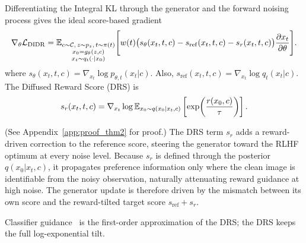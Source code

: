 \begin{theorem}
\label{thm:score_gradient}
Differentiating the Integral KL through the generator and the forward noising process gives the ideal score-based gradient
\begin{equation}
\begin{aligned}
\nabla_\theta\mathcal{L}_{\mathrm{DIDR}}
=
\mathbb{E}_{\substack{c\sim\mathcal{C},\,z\sim p_z,\,t\sim\pi(t)\\
x_0=g_\theta(z,c)\\
x_t\sim q_t(\cdot|x_0)}}
\Bigg[
w(t)
\bigl(
s_\theta(x_t,t,c)
- s_{\mathrm{ref}}(x_t,t,c)
- s_r(x_t,t,c)
\bigr)
\frac{\partial x_t}{\partial\theta}
\Bigg].
\end{aligned}
\label{eq:ikl_grad}
\end{equation}
where $s_\theta(x_t,t,c)=\nabla_{x_t}\log p_{\theta,t}(x_t|c)$.
Also, $s_{\mathrm{ref}}(x_t,t,c)=\nabla_{x_t}\log q_t(x_t|c)$. The Diffused Reward Score (DRS) is
\begin{equation}
s_r(x_t,t,c)
=
\nabla_{x_t}\log
\mathbb{E}_{x_0\sim q(x_0|x_t,c)}
\left[
\exp\!\left(\frac{r(x_0,c)}{\tau}\right)
\right].
\label{eq:sr_definition}
\end{equation}
\end{theorem}
(See Appendix~\ref{app:proof_thm2} for proof.) The DRS term $s_r$ adds a reward-driven correction to the reference score, steering the generator toward the RLHF optimum at every noise level. Because $s_r$ is defined through the posterior $q(x_0|x_t,c)$, it propagates preference information only where the clean image is identifiable from the noisy observation, naturally attenuating reward guidance at high noise. The generator update is therefore driven by the mismatch between its own score and the reward-tilted target score $s_{\mathrm{ref}}+s_r$.

\begin{remark}
\label{rem:classifier_guidance}
Classifier guidance~\citep{dhariwal2021diffusion} is the first-order approximation of the DRS; the DRS keeps the full log-exponential tilt.
\end{remark}


